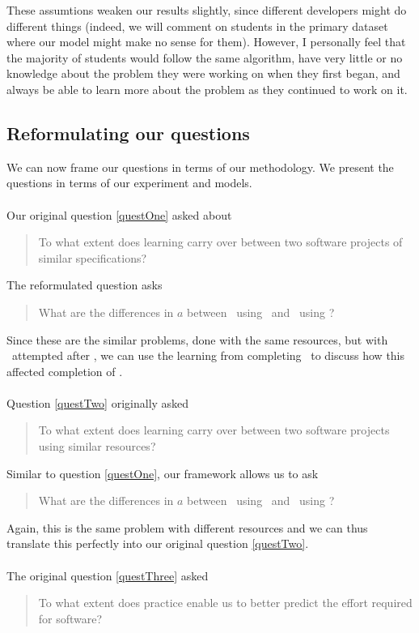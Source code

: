 These assumtions weaken our results slightly, since different developers might
do different things (indeed, we will comment on students in the primary
dataset where our model might make no sense for them).
However, I personally feel that the majority of students would follow the same
algorithm, have very little or no knowledge about the problem they were working
on when they first began, and always be able to learn more about the problem as
they continued to work on it.

\subsection{Reformulating our questions} \label{subsecReform}

We can now frame our questions in terms of our methodology.
We present the questions in terms of our experiment and models.\\
\\
Our original question \ref{questOne} asked about 
\begin{quote}
  To what extent does learning carry over between two software projects of similar
  specifications?
\end{quote}

The reformulated question asks
\begin{quote}
  What are the differences in $a$ between \PO\ using \LA\ and \PT\ using \LA?
\end{quote}\label{qq1}

Since these are the similar problems, done with the same resources, but with
\PO\ attempted after \PT, we can use the learning from completing \PO\ to
discuss how this affected completion of \PT.\\
\\
Question \ref{questTwo} originally asked
\begin{quote}
  To what extent does learning carry over between two software projects using
  similar resources?
\end{quote}

Similar to question \ref{questOne}, our framework allows us to ask
\begin{quote}
   What are the differences in $a$ between \PO\ using \LA\ and \PO\ using
  \LB?
\end{quote} \label{qq2}

Again, this is the same problem with different resources and we can thus
translate this perfectly into our original question \ref{questTwo}.\\
\\
The original question \ref{questThree} asked
\begin{quote}
  To what extent does practice enable us to better predict the effort required
  for software?
\end{quote}

